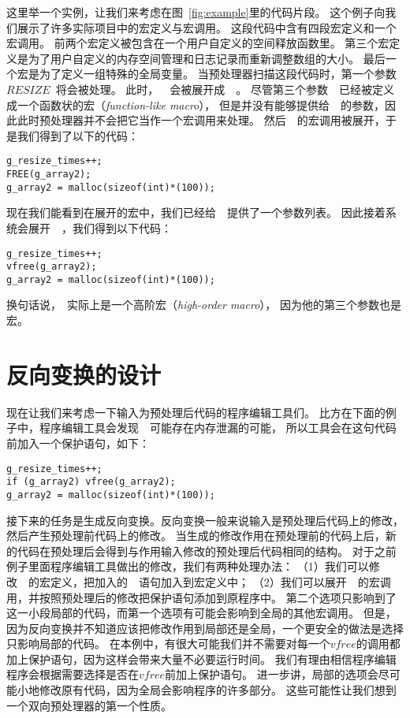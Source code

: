 这里举一个实例，让我们来考虑在图~\ref{fig:example}里的代码片段。
这个例子向我们展示了许多实际项目中的宏定义与宏调用。
这段代码中含有四段宏定义和一个宏调用。
前两个宏定义被包含在一个用户自定义的空间释放函数里。
第三个宏定义是为了用户自定义的内存空间管理和日志记录而重新调整数组的大小。
最后一个宏是为了定义一组特殊的全局变量。
当预处理器扫描这段代码时，第一个参数~$RESIZE$~将会被处理。
此时，~~会被展开成~~。
尽管第三个参数~~已经被定义成一个函数状的宏（\emph{function-like macro}），
但是并没有能够提供给~~的参数，因此此时预处理器并不会把它当作一个宏调用来处理。
然后~~的宏调用被展开，于是我们得到了以下的代码：
\begin{lstlisting}
g_resize_times++;
FREE(g_array2);
g_array2 = malloc(sizeof(int)*(100));
\end{lstlisting}
现在我们能看到在展开的宏中，我们已经给~~提供了一个参数列表。
因此接着系统会展开~~，我们得到以下代码：
\begin{lstlisting}
g_resize_times++;
vfree(g_array2);
g_array2 = malloc(sizeof(int)*(100));
\end{lstlisting}
换句话说，~实际上是一个高阶宏（\emph{high-order macro}），
因为他的第三个参数也是宏。

\section{反向变换的设计}\label{sec:backdesign}
现在让我们来考虑一下输入为预处理后代码的程序编辑工具们。
比方在下面的例子中，程序编辑工具会发现~~可能存在内存泄漏的可能，
所以工具会在这句代码前加入一个保护语句，如下：
\begin{lstlisting}
g_resize_times++;
if (g_array2) vfree(g_array2);
g_array2 = malloc(sizeof(int)*(100));
\end{lstlisting}

接下来的任务是生成反向变换。反向变换一般来说输入是预处理后代码上的修改，
然后产生预处理前代码上的修改。
当生成的修改作用在预处理前的代码上后，新的代码在预处理后会得到与作用输入修改的预处理后代码相同的结构。
对于之前例子里面程序编辑工具做出的修改，我们有两种处理办法：
（1）我们可以修改~~的宏定义，把加入的~~语句加入到宏定义中；
（2）我们可以展开~~的宏调用，并按照预处理后的修改把保护语句添加到原程序中。
第二个选项只影响到了这一小段局部的代码，而第一个选项有可能会影响到全局的其他宏调用。
但是，因为反向变换并不知道应该把修改作用到局部还是全局，一个更安全的做法是选择只影响局部的代码。
在本例中，有很大可能我们并不需要对每一个$vfree$的调用都加上保护语句，因为这样会带来大量不必要运行时间。
我们有理由相信程序编辑程序会根据需要选择是否在$vfree$前加上保护语句。
进一步讲，局部的选项会尽可能小地修改原有代码，因为全局会影响程序的许多部分。
这些可能性让我们想到一个双向预处理器的第一个性质。

